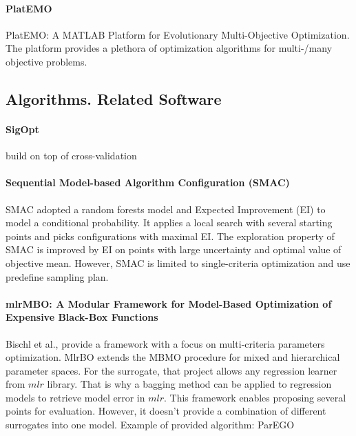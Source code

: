         \paragraph{PlatEMO} \cite{PlatEMO} PlatEMO: A MATLAB Platform for Evolutionary Multi-Objective Optimization. The platform provides a plethora of optimization algorithms for multi-/many objective problems.

        \subsection{Algorithms. Related Software}


        \paragraph{SigOpt} build on top of cross-validation


        \paragraph{Sequential Model-based Algorithm Configuration (SMAC)} SMAC\cite{smac-2017} adopted a random forests model and Expected Improvement (EI) to model a conditional probability. It applies a local search with several starting points and picks configurations with maximal EI. The exploration property of SMAC is improved by EI on points with large uncertainty and optimal value of objective mean. However, SMAC is limited to single-criteria optimization and use predefine sampling plan.

        \paragraph{mlrMBO: A Modular Framework for Model-Based Optimization of Expensive Black-Box Functions} Bischl et al.,\cite{mlrMBO} provide a framework with a focus on multi-criteria parameters optimization. MlrBO extends the MBMO procedure for mixed and hierarchical parameter spaces. For the surrogate, that project allows any regression learner from $mlr$ library. That is why a bagging method can be applied to regression models to retrieve model error in $mlr$. This framework enables proposing several points for evaluation. However, it doesn't provide a combination of different surrogates into one model. Example of provided algorithm: ParEGO
